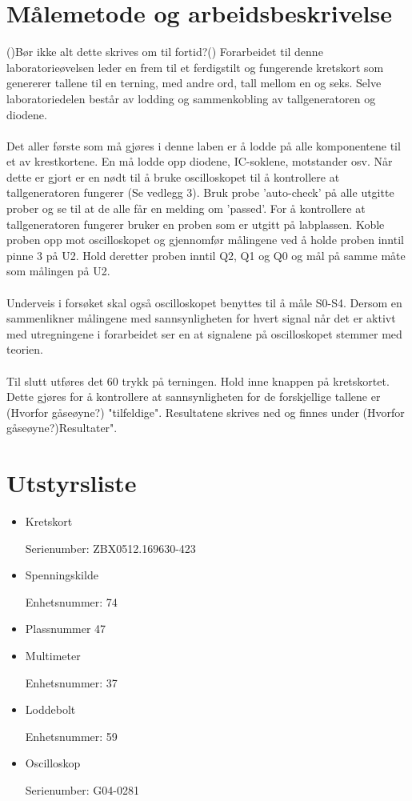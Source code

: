 \documentclass[12pt,norsk,a4paper]{article}
\begin{document}
\section{Målemetode og arbeidsbeskrivelse}
()Bør ikke alt dette skrives om til fortid?()
Forarbeidet til denne laboratorieøvelsen leder en frem til et ferdigstilt og fungerende kretskort som genererer tallene til en terning, med andre ord, tall mellom en og seks. Selve laboratoriedelen består av lodding og sammenkobling av tallgeneratoren og diodene.
\\
\\
Det aller første som må gjøres i denne laben er å lodde på alle komponentene til et av krestkortene. En må lodde opp diodene, IC-soklene, motstander osv. Når dette er gjort er en nødt til å bruke oscilloskopet til å kontrollere at tallgeneratoren fungerer (Se vedlegg 3). Bruk probe 'auto-check' på alle utgitte prober og se til at de alle får en melding om 'passed'. For å kontrollere at tallgeneratoren fungerer bruker en proben som er utgitt på labplassen. Koble proben opp mot oscilloskopet og gjennomfør målingene ved å holde proben inntil pinne 3 på U2. Hold deretter proben inntil Q2, Q1 og Q0 og mål på samme måte som målingen på U2. 
\\
\\
Underveis i forsøket skal også oscilloskopet benyttes til å måle S0-S4. Dersom en sammenlikner målingene med sannsynligheten for hvert signal når det er aktivt med utregningene i forarbeidet ser en at signalene på oscilloskopet stemmer med teorien.
\\
\\
Til slutt utføres det 60 trykk på terningen. Hold inne knappen på kretskortet. Dette gjøres for å kontrollere at sannsynligheten for de forskjellige tallene er (Hvorfor gåseøyne?) "tilfeldige". Resultatene skrives ned og finnes under (Hvorfor gåseøyne?)Resultater". 
\clearpage


\section{Utstyrsliste} 
    \begin{itemize} 
    \item Kretskort

Serienumber: ZBX0512.169630-423
    \item Spenningskilde

Enhetsnummer: 74
    \item Plassnummer 47
    \item Multimeter

Enhetsnummer: 37
    \item Loddebolt

Enhetsnummer: 59
    \item Oscilloskop

Serienumber: G04-0281

    \end{itemize}
\clearpage
\end{document}

